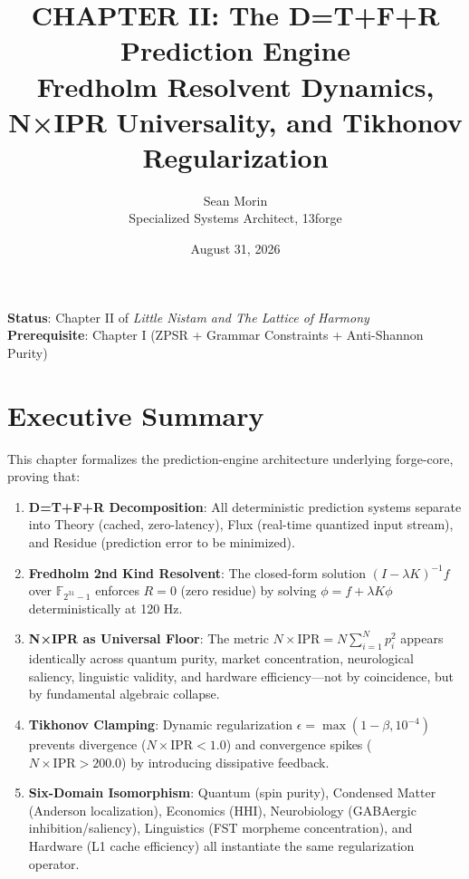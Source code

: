 \documentclass[11pt,oneside]{article}
\title{CHAPTER II: The D=T+F+R Prediction Engine\\
Fredholm Resolvent Dynamics, N×IPR Universality, and Tikhonov Regularization}
\author{Sean Morin \\ Specialized Systems Architect, 13forge}
\date{August 31, 2026}
\theoremstyle{definition}
\begin{document}
\maketitle

\begin{center}
\textbf{Status}: Chapter II of \emph{Little Nistam and The Lattice of Harmony} \\
\textbf{Prerequisite}: Chapter I (ZPSR + Grammar Constraints + Anti-Shannon Purity)
\end{center}

\section*{Executive Summary}

This chapter formalizes the prediction-engine architecture underlying forge-core, proving that:

\begin{enumerate}
  \item \textbf{D=T+F+R Decomposition}: All deterministic prediction systems separate into Theory (cached, zero-latency), Flux (real-time quantized input stream), and Residue (prediction error to be minimized).

  \item \textbf{Fredholm 2nd Kind Resolvent}: The closed-form solution $(I - \lambda K)^{-1} f$ over $\mathbb{F}_{2^{31}-1}$ enforces $R = 0$ (zero residue) by solving $\phi = f + \lambda K\phi$ deterministically at 120 Hz.

  \item \textbf{N×IPR as Universal Floor}: The metric $N \times \text{IPR} = N \sum_{i=1}^N p_i^2$ appears identically across quantum purity, market concentration, neurological saliency, linguistic validity, and hardware efficiency—not by coincidence, but by fundamental algebraic collapse.

  \item \textbf{Tikhonov Clamping}: Dynamic regularization $\epsilon = \max(1-\beta, 10^{-4})$ prevents divergence ($N \times \text{IPR} < 1.0$) and convergence spikes ($N \times \text{IPR} > 200.0$) by introducing dissipative feedback.

  \item \textbf{Six-Domain Isomorphism}: Quantum (spin purity), Condensed Matter (Anderson localization), Economics (HHI), Neurobiology (GABAergic inhibition/saliency), Linguistics (FST morpheme concentration), and Hardware (L1 cache efficiency) all instantiate the same regularization operator.
\end{enumerate}
\end{document}
